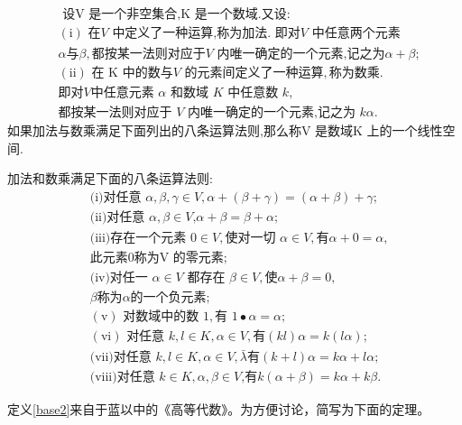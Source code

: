 \documentclass[12pt,hyperref,a4paper,UTF8]{ctexart}
\begin{document}
\begin{Definition}
$$
\begin{aligned}
&\text{ 设V 是一个非空集合,K 是一个数域.又设:} \\
&\mathrm{(i)}\text{ 在}V\text{ 中定义了一种运算,称为加法. 即对}V\text{ 中任意两个元素} \\
&\alpha 与 \beta,\text{都按某一法则对应于}V\text{ 内唯一确定的一个元素,记之为} \alpha+\beta; \\
&\mathrm{(ii)}\text{ 在 K 中的数与}V\text{ 的元素间定义了一种运算},\textbf{称为数乘}.\\ 
&\text{即} \text{对} V\text{中任意元素 }\alpha\text{ 和数域 }K\text{ 中任意数 }k,\\
&\text{都按某一法则对应于 }V\text{ 内}  
\text{唯一} \text{确定的一个元素,记之为 }k\alpha.  
\end{aligned}$$
如果加法与数乘满足下面列出的八条运算法则,那么称V 是数域K 上的一个线性空间. 

加法和数乘满足下面的八条运算法则:
$$\begin{aligned}\label{base2}
& \text{(i)对任意 }\alpha,\beta,\gamma\in V,\alpha+(\beta+\gamma)=(\alpha+\beta)+\gamma;  \\
&\text{(ii)对任意 }\alpha,\beta{\in}V\text{,}\alpha+\beta{=}\beta{+}\alpha; \\
& (\text{iii)存在一个元素 }0\in V,\text{使对一切 }\alpha{\in}V,\text{有} \alpha+0=\alpha, \\
&\text{此元素0称为V 的零元素;}  \\
&(\text{iv)对任一 }\alpha{\in}V\text{ 都存在 }\beta{\in}V,\text{使} \alpha+\beta=0, \\
&\beta  \text{称为}\alpha \text{的一个负元素;}  \\
&\mathrm{(v)}\text{ 对数域中的数 }1,\text{有 }1\bullet\alpha{=}\alpha; \\
&(\mathrm{vi})\text{ 对任意 }k,l\in K,\alpha{\in}V,\text{有} (kl)\alpha  =k\left(l\alpha\right);  \\
&(\text{vii)对任意 }k,l\in K,\alpha\in V,\bar{\lambda} \text{有}  (k+l)\alpha  =k\alpha+l\alpha;  \\
&(\text{viii)对任意 }k\in K,\alpha,\beta{\in}V \text{,有}  k\left(\alpha+\beta\right) =k\alpha+k\beta. 
\end{aligned}$$
\end{Definition}

定义\ref{base2}来自于蓝以中的《高等代数》。为方便讨论，简写为下面的定理。
\end{document}
